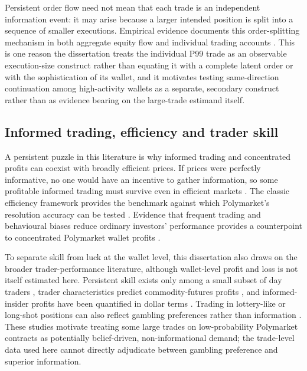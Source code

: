 Persistent order flow need not mean that each trade is an independent information event: it may arise because a larger intended position is split into a sequence of smaller executions. Empirical evidence documents this order-splitting mechanism in both aggregate equity flow and individual trading accounts \citep{toth2015orderflow,sato2023ordersplitting}. This is one reason the dissertation treats the individual P99 trade as an observable execution-size construct rather than equating it with a complete latent order or with the sophistication of its wallet, and it motivates testing same-direction continuation among high-activity wallets as a separate, secondary construct rather than as evidence bearing on the large-trade estimand itself.

\subsection{Informed trading, efficiency and trader skill}
\label{lr:informed-trading}

A persistent puzzle in this literature is why informed trading and concentrated profits can coexist with broadly efficient prices. If prices were perfectly informative, no one would have an incentive to gather information, so some profitable informed trading must survive even in efficient markets \citep{grossmanstiglitz1980impossibility}. The classic efficiency framework provides the benchmark against which Polymarket's resolution accuracy can be tested \citep{fama1970efficient}. Evidence that frequent trading and behavioural biases reduce ordinary investors' performance provides a counterpoint to concentrated Polymarket wallet profits \citep{barberodean2000hazardous,odean1998disposition,odean1999toomuch}.

To separate skill from luck at the wallet level, this dissertation also draws on the broader trader-performance literature, although wallet-level profit and loss is not itself estimated here. Persistent skill exists only among a small subset of day traders \citep{barber2014speculatorskill}, trader characteristics predict commodity-futures profits \citep{dewally2013traderprofits}, and informed-insider profits have been quantified in dollar terms \citep{czirakigider2021insiderprofits}. Trading in lottery-like or long-shot positions can also reflect gambling preferences rather than information \citep{kumar2009gambles,dorn2015gambling}. These studies motivate treating some large trades on low-probability Polymarket contracts as potentially belief-driven, non-informational demand; the trade-level data used here cannot directly adjudicate between gambling preference and superior information.

